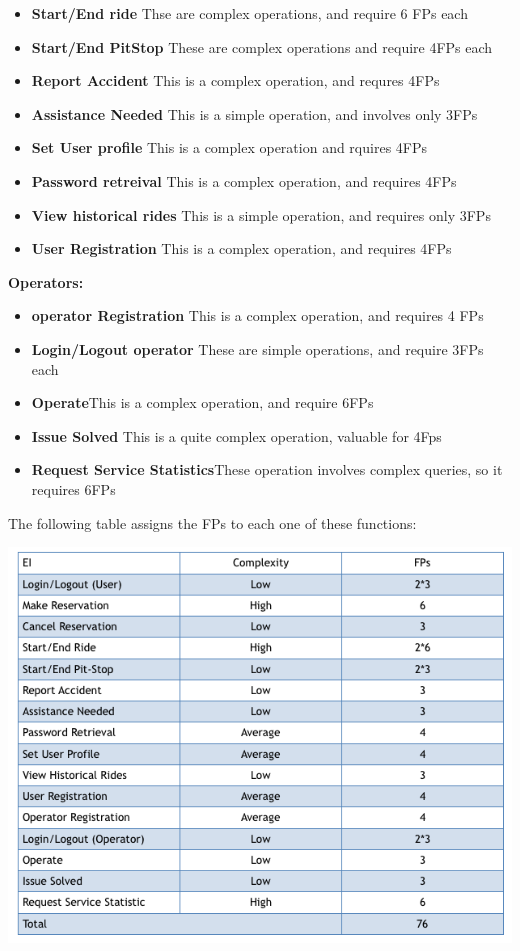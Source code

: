 \documentclass{article}
\begin{document}
\begin{flushleft}
\begin{itemize}
\item\textbf{Start/End ride} Thse are complex operations, and require 6 FPs each
\item\textbf{Start/End PitStop} These are complex operations and require 4FPs each
\item\textbf{Report Accident} This is a complex operation, and requres 4FPs
\item\textbf{Assistance Needed} This is a simple operation, and involves only 3FPs
\item\textbf{Set User profile} This is a complex operation and rquires 4FPs
\item\textbf{Password retreival} This is a complex operation, and requires 4FPs
\item\textbf{View historical rides} This is a simple operation, and requires only 3FPs
\item\textbf{User Registration} This is a complex operation, and requires 4FPs

\end{itemize}

\textbf{Operators:}
\begin{itemize}
\item\textbf{operator Registration} This is a complex operation, and requires 4 FPs

\item\textbf{Login/Logout operator} These are simple operations, and require 3FPs each
\item\textbf{Operate}This is a complex operation, and require 6FPs
\item\textbf{Issue Solved} This is a quite complex operation, valuable for 4Fps
\item\textbf{Request Service Statistics}These operation involves complex queries, so it requires 6FPs
\end{itemize}

The following table assigns the FPs to each one of these functions:

\includegraphics[scale=0.5]{EI}


\end{flushleft}
\end{document}
